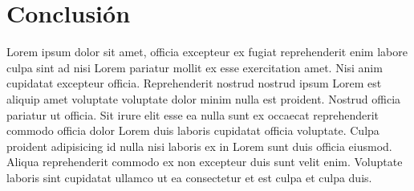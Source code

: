 \documentclass[doc,12pt]{apa7}
\begin{document}
\section{Conclusión}

Lorem ipsum dolor sit amet, officia excepteur ex fugiat reprehenderit enim labore culpa sint ad nisi Lorem pariatur mollit ex esse exercitation amet. Nisi anim cupidatat excepteur officia. Reprehenderit nostrud nostrud ipsum Lorem est aliquip amet voluptate voluptate dolor minim nulla est proident. Nostrud officia pariatur ut officia. Sit irure elit esse ea nulla sunt ex occaecat reprehenderit commodo officia dolor Lorem duis laboris cupidatat officia voluptate. Culpa proident adipisicing id nulla nisi laboris ex in Lorem sunt duis officia eiusmod. Aliqua reprehenderit commodo ex non excepteur duis sunt velit enim. Voluptate laboris sint cupidatat ullamco ut ea consectetur et est culpa et culpa duis.



\printbibliography %


\end{document}
